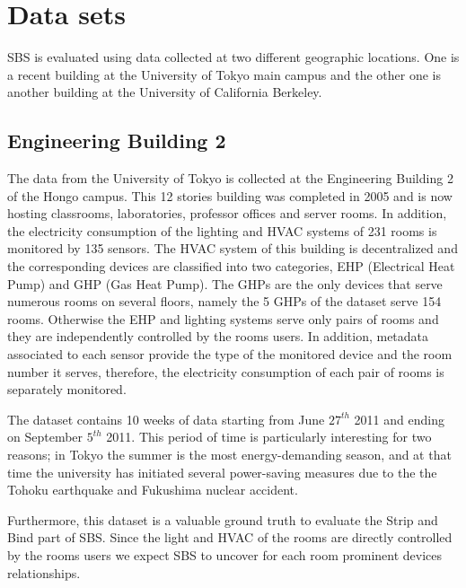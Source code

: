 \section{Data sets}
SBS is evaluated using data collected at two different geographic locations.
One is a recent building at the University of Tokyo main campus and the other one is another building at the University of California Berkeley.

\subsection{Engineering Building 2} \label{data:engbldg2}
The data from the University of Tokyo is collected at the Engineering Building 2 of the Hongo campus. 
This 12 stories building was completed in 2005 and is now hosting classrooms, laboratories, professor offices and server rooms.
In addition, the electricity consumption of the lighting and HVAC systems of 231 rooms is monitored by 135 sensors.
The HVAC system of this building is decentralized and the corresponding devices are classified into two categories, EHP (Electrical Heat Pump) and GHP (Gas Heat Pump).
The GHPs are the only devices that serve numerous rooms on several floors, namely the 5 GHPs of the dataset serve 154 rooms.
Otherwise the EHP and lighting systems serve only pairs of rooms and they are independently controlled by the rooms users.
In addition, metadata associated to each sensor provide the type of the monitored device and the room number it serves, therefore, the electricity consumption of each pair of rooms is separately monitored.

The dataset contains 10 weeks of data starting from June $27^{th}$ 2011 and ending on September $5^{th}$ 2011.
This period of time is particularly interesting for two reasons; in Tokyo the summer is the most energy-demanding season, and at that time the university has initiated several power-saving measures due to the the Tohoku earthquake and Fukushima nuclear accident.

Furthermore, this dataset is a valuable ground truth to evaluate the Strip and Bind part of SBS.
Since the light and HVAC of the rooms are directly controlled by the rooms users we expect SBS to uncover for each room prominent devices relationships.

